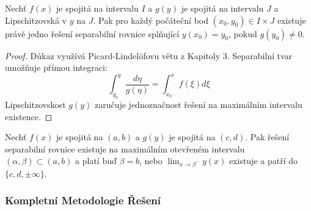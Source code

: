 \begin{theorem}
Nechť $f(x)$ je spojitá na intervalu $I$ a $g(y)$ je spojitá na intervalu $J$ a Lipschitzovská v $y$ na $J$. Pak pro každý počáteční bod $(x_0, y_0) \in I \times J$ existuje právě jedno řešení separabilní rovnice splňující $y(x_0) = y_0$, pokud $g(y_0) \neq 0$.
\end{theorem}

\vspace{0.4\baselineskip}

\begin{proof}
Důkaz využívá Picard-Lindelöfovu větu z Kapitoly 3. Separabilní tvar umožňuje přímou integraci:
\[
\int_{y_0}^y \frac{d\eta}{g(\eta)} = \int_{x_0}^x f(\xi)  d\xi
\]
Lipschitzovskost $g(y)$ zaručuje jednoznačnost řešení na maximálním intervalu existence.
\end{proof}

\vspace{0.6\baselineskip}

\begin{theorem}
Nechť $f(x)$ je spojitá na $(a,b)$ a $g(y)$ je spojitá na $(c,d)$. Pak řešení separabilní rovnice existuje na maximálním otevřeném intervalu $(\alpha,\beta) \subset (a,b)$ a platí buď $\beta = b$, nebo $\lim_{x\to\beta^-} y(x)$ existuje a patří do $\{c,d,\pm\infty\}$.
\end{theorem}

\vspace{0.8\baselineskip}

\subsubsection{Kompletní Metodologie Řešení}
\label{subsubsec:kompletni-metodologie}

